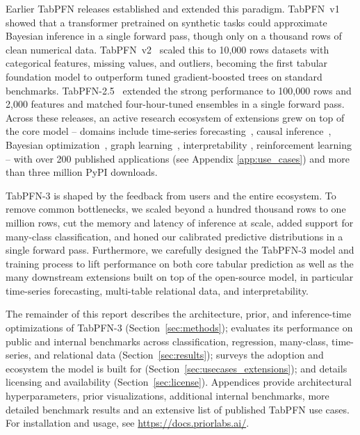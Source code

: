 Earlier TabPFN releases established and extended this paradigm. TabPFN~v1~\citep{hollmann2022tabpfnv1} showed that a transformer pretrained on synthetic tasks could approximate Bayesian inference in a single forward pass, though only on a thousand rows of clean numerical data. TabPFN~v2~\citep{Hollmann2025tabpfnv2} scaled this to 10,000 rows datasets with categorical features, missing values, and outliers, becoming the first tabular foundation model to outperform tuned gradient-boosted trees on standard benchmarks. TabPFN-2.5~\citep{TabPFN-2.5} extended the strong performance to 100{,}000 rows and 2{,}000 features and matched four-hour-tuned ensembles in a single forward pass. 
Across these releases, an active research ecosystem of extensions grew on top of the core model -- domains include time-series forecasting~\citep{hoo2024tabpfn_ts}, causal inference~\citep{robertson_dopfn, balazadeh_causalpfn, feuerriegel_causalfm}, Bayesian optimization~\citep{Yu2025GITBO}, graph learning~\citep{Hayler2025GraphsTablesZeroShot, eremeev2025turningtabularfoundationmodels}, interpretability \cite{rundel2024interpretable, ye2026closer}, reinforcement learning \cite{Schiff2025TabPFNRL}
-- with over 200 published applications (see Appendix \ref{app:use_cases}) and more than three million PyPI downloads.

TabPFN-3 is shaped by the feedback from users and the entire ecosystem. To remove common bottlenecks, we scaled beyond a hundred thousand rows to one million rows, cut the memory and latency of inference at scale, added support for many-class classification, and honed our calibrated predictive distributions in a single forward pass.
Furthermore, we carefully designed the TabPFN-3 model
and training process to lift performance on both core tabular prediction as well as the
many downstream extensions built on top of the open-source model, in particular time-series forecasting, multi-table relational data, and interpretability.

The remainder of this report describes the architecture, prior, and inference-time optimizations of TabPFN-3 (Section~\ref{sec:methods}); evaluates its performance on public and internal benchmarks across classification, regression, many-class, time-series, and relational data (Section~\ref{sec:results}); surveys the adoption and ecosystem the model is built for (Section~\ref{sec:usecases_extensions}); and details licensing and availability (Section~\ref{sec:license}). Appendices provide architectural hyperparameters, prior visualizations, additional internal benchmarks, more detailed benchmark results and an extensive list of published TabPFN use cases. For installation and usage, see \url{https://docs.priorlabs.ai/}.


